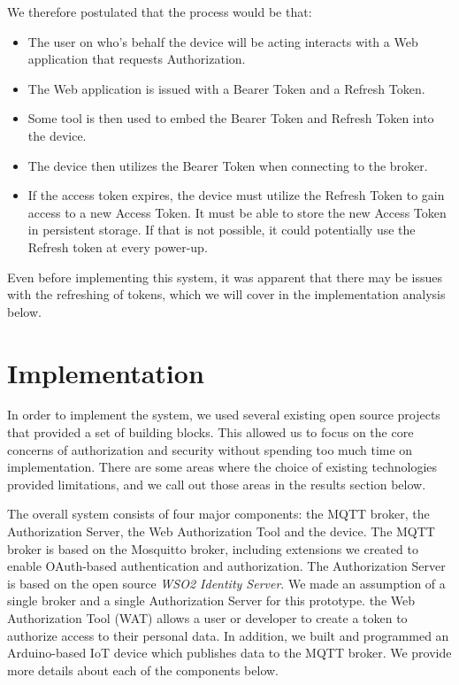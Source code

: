 \documentclass{IEEEtran}
\begin{document}
We therefore postulated that the process would be that:
\begin{itemize} 
\item The user on who's behalf the device will be acting interacts with a Web application that 
requests Authorization. 
\item The Web application is issued with a Bearer Token and a Refresh Token. 
\item Some tool is then used to embed the Bearer Token and Refresh Token into the device.
\item The device then utilizes the Bearer Token when connecting to the broker.
\item If the access token expires, the device must utilize the Refresh Token to gain access 
to a new Access Token. It must be able to store the new Access Token in persistent storage. If that is not
possible, it could potentially use the Refresh token at every power-up.
\end{itemize}

Even before implementing this system, it was apparent that there may be issues with the refreshing of
tokens, which we will cover in the implementation analysis below.
\fi

\section{Implementation}\label{sect:imp}
In order to implement the system, we used several existing open source projects that provided a 
set of building blocks. This allowed us to focus on the core concerns of authorization and security
without spending too much time on implementation. There are some areas where the choice of 
existing technologies provided limitations, and we call out those areas in the results section below.

The overall system consists of four major components: the MQTT broker, the Authorization Server, the Web Authorization Tool and the device. The MQTT broker is based on the Mosquitto broker, including extensions we created to enable
OAuth-based authentication and authorization.
The Authorization Server is based on the open source \emph{WSO2 Identity Server}.
We made an assumption of a single broker and a single Authorization Server for this prototype.
the Web Authorization Tool (WAT) allows a user or developer
to create a token to authorize access to their personal data.
In addition, we built and programmed an Arduino-based IoT device which publishes data to the MQTT broker.  We provide more details about each of the components below.
\end{document}
